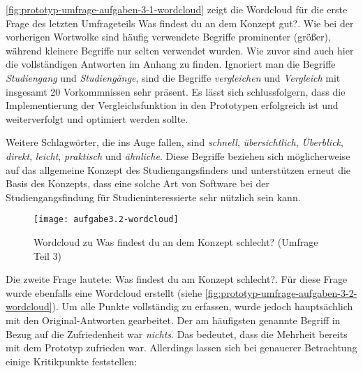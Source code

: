 \autoref{fig:prototyp-umfrage-aufgaben-3-1-wordcloud} zeigt die Wordcloud für die erste Frage des letzten Umfrageteils \glqq Was findest du an dem Konzept gut?\grqq{}. Wie bei der vorherigen Wortwolke sind häufig verwendete Begriffe prominenter (größer), während kleinere Begriffe nur selten verwendet wurden. Wie zuvor sind auch hier die vollständigen Antworten im Anhang zu finden. Ignoriert man die Begriffe \textit{Studiengang} und \textit{Studiengänge}, sind die Begriffe \textit{vergleichen} und \textit{Vergleich} mit insgesamt 20 Vorkommnissen sehr präsent. Es lässt sich schlussfolgern, dass die Implementierung der Vergleichsfunktion in den Prototypen erfolgreich ist und weiterverfolgt und optimiert werden sollte.

Weitere Schlagwörter, die ins Auge fallen, sind \textit{schnell}, \textit{übersichtlich}, \textit{Überblick}, \textit{direkt}, \textit{leicht}, \textit{praktisch} und \textit{ähnliche}. Diese Begriffe beziehen sich möglicherweise auf das allgemeine Konzept des Studiengangsfinders und unterstützen erneut die Basis des Konzepts, dass eine solche Art von Software bei der Studiengangsfindung für Studieninteressierte sehr nützlich sein kann.


\begin{figure}[H]
    \centering
    \texttt{[image: aufgabe3.2-wordcloud]}
    \caption{Wordcloud zu \glqq Was findest du an dem Konzept schlecht?\grqq{} (Umfrage Teil 3)}
    \label{fig:prototyp-umfrage-aufgaben-3-2-wordcloud}
\end{figure}

Die zweite Frage lautete: \glqq Was findest du am Konzept schlecht?\grqq{}. Für diese Frage wurde ebenfalls eine Wordcloud erstellt (siehe \autoref{fig:prototyp-umfrage-aufgaben-3-2-wordcloud}). Um alle Punkte vollständig zu erfassen, wurde jedoch hauptsächlich mit den Original-Antworten gearbeitet. Der am häufigsten genannte Begriff in Bezug auf die Zufriedenheit war \textit{nichts}. Das bedeutet, dass die Mehrheit bereits mit dem Prototyp zufrieden war. Allerdings lassen sich bei genauerer Betrachtung einige Kritikpunkte feststellen:

